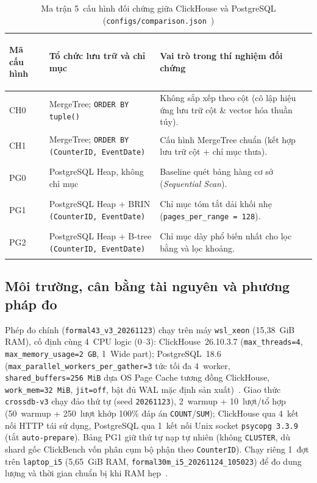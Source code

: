 \documentclass[13pt,a4paper]{report}
\begin{document}
\begin{table}[!htb]
\centering
\footnotesize
\renewcommand{\arraystretch}{1.15}
\caption{Ma trận 5~cấu hình đối chứng giữa ClickHouse và PostgreSQL (\texttt{configs/comparison.json}~\cite{M7})}
\label{tab:ch4_matrix}
\begin{tabularx}{\textwidth}{>{\bfseries\raggedright\arraybackslash}p{2.3cm} >{\raggedright\arraybackslash}p{5.5cm} >{\raggedright\arraybackslash}X}
\toprule
\textbf{Mã cấu hình} & \textbf{Tổ chức lưu trữ và chỉ mục} & \textbf{Vai trò trong thí nghiệm đối chứng} \\
\midrule
CH0 & MergeTree; \texttt{ORDER BY tuple()} & Không sắp xếp theo cột (cô lập hiệu ứng lưu trữ cột \& vector hóa thuần túy). \\
\addlinespace
CH1 & MergeTree; \texttt{ORDER BY (\allowbreak{}CounterID, EventDate)} & Cấu hình MergeTree chuẩn (kết hợp lưu trữ cột + chỉ mục thưa). \\
\addlinespace
PG0 & PostgreSQL Heap, không chỉ mục & Baseline quét bảng hàng cơ sở (\textit{Sequential Scan}). \\
\addlinespace
PG1 & PostgreSQL Heap + BRIN \texttt{(\allowbreak{}CounterID, EventDate)} & Chỉ mục tóm tắt dải khối nhẹ (\texttt{pages\_\allowbreak{}per\_\allowbreak{}range = 128}). \\
\addlinespace
PG2 & PostgreSQL Heap + B-tree \texttt{(\allowbreak{}CounterID, EventDate)} & Chỉ mục dày phổ biến nhất cho lọc bằng và lọc khoảng. \\
\bottomrule
\end{tabularx}
\end{table}

\subsection{Môi trường, cân bằng tài nguyên và phương pháp đo}
Phép đo chính (\texttt{formal43\_\allowbreak{}v3\_\allowbreak{}20261123}) chạy trên máy \texttt{wsl\_\allowbreak{}xeon} (15,38~GiB RAM), cố định cùng 4~CPU logic (0--3): ClickHouse~26.10.3.7 (\texttt{max\_\allowbreak{}threads=4}, \texttt{max\_\allowbreak{}memory\_\allowbreak{}usage=2~GB}, 1~Wide part); PostgreSQL~18.6 (\texttt{max\_\allowbreak{}parallel\_\allowbreak{}workers\_\allowbreak{}per\_\allowbreak{}gather=3} tức tối đa 4~worker, \texttt{shared\_\allowbreak{}buffers=256~MiB} dựa OS Page Cache tương đồng ClickHouse, \texttt{work\_\allowbreak{}mem=32~MiB}, \texttt{jit=off}, bật đủ WAL mặc định sản xuất)~\cite{P8}. Giao thức \texttt{crossdb-v3} chạy đảo thứ tự (seed \texttt{20261123}), 2~warmup + 10~lượt/tổ hợp (50~warmup + 250~lượt khớp 100\% đáp án \texttt{COUNT}/\texttt{SUM}); ClickHouse qua 4~kết nối HTTP tái sử dụng, PostgreSQL qua 1~kết nối Unix socket \texttt{psycopg 3.3.9} (tắt \texttt{auto-prepare}). Bảng PG1 giữ thứ tự nạp tự nhiên (không \texttt{CLUSTER}, dù shard gốc ClickBench vốn phân cụm bộ phận theo \texttt{CounterID}). Chạy riêng 1~đợt trên \texttt{laptop\_\allowbreak{}i5} (5,65~GiB RAM, \texttt{formal30m\_\allowbreak{}i5\_\allowbreak{}20261124\_\allowbreak{}105023}) để đo dung lượng và thời gian chuẩn bị khi RAM hẹp~\cite{M7}.
\end{document}

